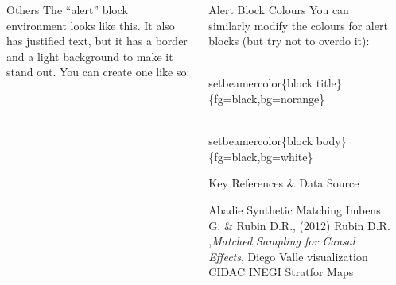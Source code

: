 \documentclass[final]{beamer}
\newlength{\onecolwid}
\newlength{\threecolwid}
\begin{document}
\begin{frame}[t]
\begin{columns}[t]
\begin{column}{\threecolwid}
\begin{columns}[t,totalwidth=\threecolwid]
\begin{column}{\onecolwid}
        \end{column}
\begin{column}{\onecolwid}
      \begin{alertblock}{Others}
        The ``alert'' block environment looks like this. It also has justified text, but it has a border and a light background to make it stand out. You can create one like so:
      \end{alertblock}
        \end{column}
        \begin{column}{\onecolwid}
          \begin{alertblock}{Alert Block Colours}
            You can similarly modify the colours for alert blocks (but try not to overdo it):\\
            \begin{semiverbatim}
              {\color{red}\\setbeamercolor}\{block title\}\newline \{fg=black,bg=norange\}
            \end{semiverbatim}
            \begin{semiverbatim}
              {\color{red}\\setbeamercolor}\{block  body\}\newline \{fg=black,bg=white\}
            \end{semiverbatim}
          \end{alertblock}        
          \begin{block}{Key References \& Data Source}
   
            
		        \small{\begin{thebibliography}{99}
				 Abadie  Synthetic Matching 
		         Imbens G. \& Rubin D.R., (2012)
				 Rubin D.R. ,\emph{Matched Sampling for Causal Effects},
				 Diego Valle visualization
				 CIDAC
				 INEGI
				 Stratfor Maps
		   \end{thebibliography}}


\end{block}
\end{column}
\end{columns}
\end{column}
\end{columns}
\end{frame}
\end{document}
